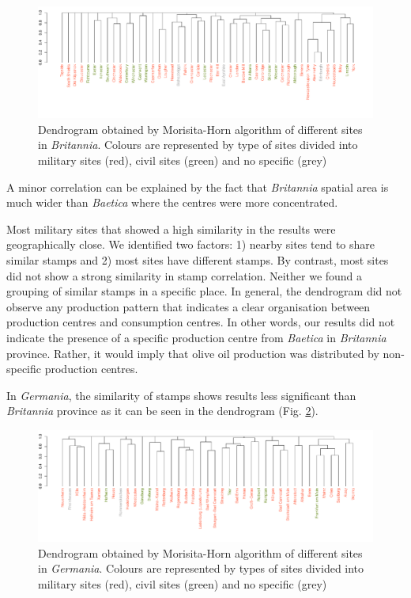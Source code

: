 \documentclass[review]{elsarticle}
\newcommand{\memo}[2]{\textcolor{#1}{#2}}
\newcommand{\xavi}[1]{\memo{magenta}{XRC: #1\\}}
\begin{document}

\begin{figure}
	\centering
\includegraphics[angle=180,width=\linewidth]{figs/dendrobrit5.pdf}
\caption{Dendrogram obtained by Morisita-Horn algorithm of different sites in \textit{Britannia}. Colours are represented by type of sites divided into military sites (red), civil sites (green) and no specific (grey)}
\label{britmap}
\end{figure}


A minor correlation can be explained by the fact that \textit{Britannia} spatial area is much wider than \textit{Baetica} where the centres were more concentrated.

Most military sites that showed a high similarity in the results were geographically close. We identified two factors: 1) nearby sites tend to share similar stamps and 2) most sites have different stamps. 
By contrast, most sites did not show a strong similarity in stamp correlation. Neither we found a grouping of similar stamps in a specific place. In general, the dendrogram did not observe any production pattern that indicates a clear organisation between production centres and consumption centres. In other words, our results did not indicate the presence of a specific production centre from \textit{Baetica} in \textit{Britannia} province. Rather, it would imply that olive oil production was distributed by non-specific production centres. 


In \textit{Germania}, the similarity of stamps shows results less significant than \textit{Britannia} province as it can be seen in the dendrogram (Fig. \ref{germap}). 

\begin{figure}
	\centering
\includegraphics[angle=180, width=\linewidth]{figs/dendroger5.pdf}
\caption{Dendrogram obtained by Morisita-Horn algorithm of different sites in \textit{Germania}. Colours are represented by types of sites divided into military sites (red), civil sites (green) and no specific (grey)}
\label{germap}
\end{figure}
\end{document}
